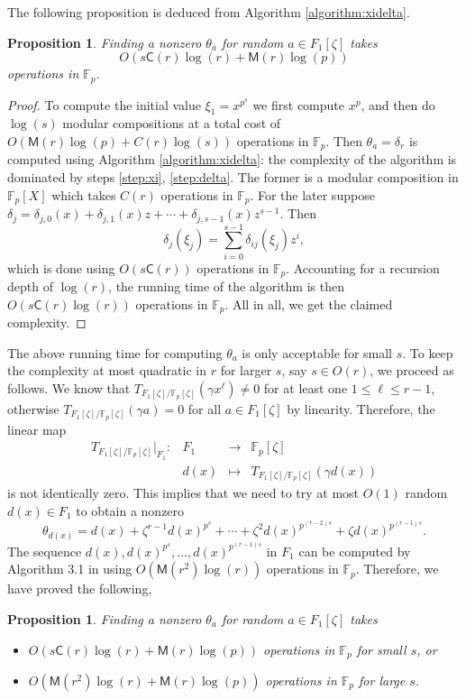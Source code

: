 \documentclass[12pt]{article}
\theoremstyle{plain}
\newtheorem{proposition}[theorem]{Proposition}
\theoremstyle{definition}
\def\F{\mathbb{F}}
\def\M{\mathsf{M}}
\def\CC{\mathsf{C}}
\newcounter{algorithm}
\begin{document}
The following proposition is deduced from Algorithm \ref{algorithm:xidelta}.
\begin{proposition}
\label{proposition:XiDelta}
	Finding a nonzero $\theta_a$ for random $a \in F_1[\zeta]$ takes \[O(s\CC(r)\log(r) + \M(r)\log(p))\] operations in $\F_p$.
\end{proposition}
\begin{proof}
	To compute the initial value $\xi_1 = x^{p^s}$ we first compute $x^p$, and then do $\log(s)$ modular compositions at a total cost of $O(\M(r)\log(p) + C(r)\log(s))$ operations in $\F_p$. Then $\theta_a = \delta_r$ is computed using Algorithm \ref{algorithm:xidelta}: the complexity of the algorithm is dominated by steps \ref{step:xi}, \ref{step:delta}. The former is a modular composition in $\F_p[X]$ which takes $C(r)$ operations in $\F_p$. For the later suppose $\delta_j = \delta_{j,0}(x) + \delta_{j,1}(x)z + \cdots + \delta_{j,s - 1}(x)z^{s - 1}$. Then   
	\[ \delta_j(\xi_j) = \sum_{i = 0}^{s - 1}\delta_{ij}(\xi_j)z^i, \]
	which is done using $O(s\CC(r))$ operations in $\F_p$. Accounting for a recursion depth of $\log(r)$, the running time of the algorithm is then $O(s\CC(r)\log(r))$ operations in $\F_p$. All in all, we get the claimed complexity.
\end{proof}
The above running time for computing $\theta_a$ is only acceptable for small $s$. To keep the complexity at most quadratic in $r$ for larger $s$, say $s \in O(r)$, we proceed as follows. We know that $T_{F_1[\zeta] / \F_p[\zeta]}(\gamma x^\ell) \ne 0$ for at least one $1 \le \ell \le r - 1$, otherwise $T_{F_1[\zeta] / \F_p[\zeta]}(\gamma a) = 0$ for all $a \in F_1[\zeta]$ by linearity. Therefore, the linear map 
\[
\begin{array}{rrll}
	T_{F_1[\zeta] / \F_p[\zeta]}\vert_{F_1}: & F_1 & \longrightarrow & \F_p[\zeta] \\
	& d(x) & \longmapsto & T_{F_1[\zeta] / \F_p[\zeta]}(\gamma d(x))
\end{array}
\]
is not identically zero. This implies that we need to try at most $O(1)$ random $d(x) \in F_1$ to obtain a nonzero
\[ \theta_{d(x)} = d(x) + \zeta^{r - 1}d(x)^{p^s} + \cdots + \zeta^2d(x)^{p^{(r - 2)s}} + \zeta d(x)^{p^{(r - 1)s}}. \]
The sequence $d(x), d(x)^{p^s}, \dots, d(x)^{p^{(r - 1)s}}$ in $F_1$ can be computed by Algorithm 3.1 in \cite{von1992computing} using $O(\M(r^2)\log(r))$ operations in $\F_p$. Therefore, we have proved the following,
\begin{proposition}
\label{proposition:XiDelta-updated}
	Finding a nonzero $\theta_a$ for random $a \in F_1[\zeta]$ takes
	\begin{itemize}
		\item $O(s\CC(r)\log(r) + \M(r)\log(p))$ operations in $\F_p$ for small $s$, or
		\item $O(\M(r^2)\log(r) + \M(r)\log(p))$ operations in $\F_p$ for large $s$.
	\end{itemize}
\end{proposition}
\end{document}
